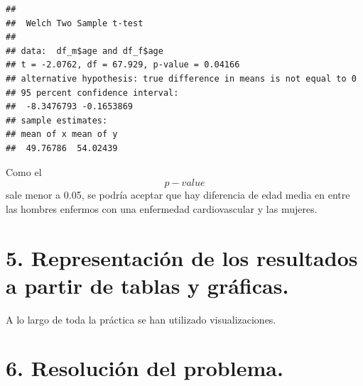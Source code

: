 \documentclass[
]{article}
\newenvironment{Shaded}{\begin{snugshade}}{\end{snugshade}}
\newcommand{\CommentTok}[1]{\textcolor[rgb]{0.56,0.35,0.01}{\textit{#1}}}
\newcommand{\FunctionTok}[1]{\textcolor[rgb]{0.13,0.29,0.53}{\textbf{#1}}}
\newcommand{\NormalTok}[1]{#1}
\newcommand{\OtherTok}[1]{\textcolor[rgb]{0.56,0.35,0.01}{#1}}
\newcommand{\SpecialCharTok}[1]{\textcolor[rgb]{0.81,0.36,0.00}{\textbf{#1}}}
\newcommand{\StringTok}[1]{\textcolor[rgb]{0.31,0.60,0.02}{#1}}
\begin{document}
\begin{Shaded}
\end{Shaded}

\begin{verbatim}
## 
##  Welch Two Sample t-test
## 
## data:  df_m$age and df_f$age
## t = -2.0762, df = 67.929, p-value = 0.04166
## alternative hypothesis: true difference in means is not equal to 0
## 95 percent confidence interval:
##  -8.3476793 -0.1653869
## sample estimates:
## mean of x mean of y 
##  49.76786  54.02439
\end{verbatim}

Como el \[ p-value\] sale menor a 0.05, se podría aceptar que hay
diferencia de edad media en entre las hombres enfermos con una
enfermedad cardiovascular y las mujeres.

\hypertarget{representaciuxf3n-de-los-resultados-a-partir-de-tablas-y-gruxe1ficas.}{%
\section{5. Representación de los resultados a partir de tablas y
gráficas.}\label{representaciuxf3n-de-los-resultados-a-partir-de-tablas-y-gruxe1ficas.}}

A lo largo de toda la práctica se han utilizado visualizaciones.

\hypertarget{resoluciuxf3n-del-problema.}{%
\section{6. Resolución del
problema.}\label{resoluciuxf3n-del-problema.}}
\end{document}
